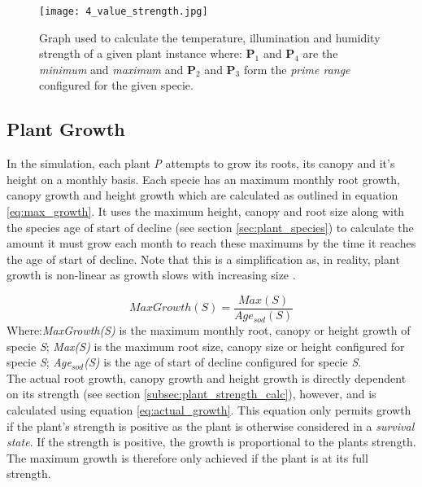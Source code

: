 \begin{figure}
\center
	\texttt{[image: 4\_value\_strength.jpg]}
	\caption{ Graph used to calculate the temperature, illumination and humidity strength of a given plant instance where: \textbf{P$_{1}$} and \textbf{P$_{4}$} are the \textit{minimum} and \textit{maximum} and \textbf{P$_{2}$} and \textbf{P$_{3}$} form the \textit{prime range} configured for the given specie.  }	
	\label{fig:4_value_strength}
\end{figure}

\subsection{Plant Growth}

In the simulation, each plant \textit{P} attempts to grow its roots, its canopy and it's height on a monthly basis. Each specie has an maximum monthly root growth, canopy growth and height growth which are calculated as outlined in equation \ref{eq:max_growth}. It uses the maximum height, canopy and root size along with the species age of start of decline (see section \ref{sec:plant_species}) to calculate the amount it must grow each month to reach these maximums by the time it reaches the age of start of decline. Note that this is a simplification as, in reality, plant growth is non-linear as growth slows with increasing size \cite{Paine2012}.

\begin{equation}
MaxGrowth(S) = \frac{Max(S)}{Age_{sod}(S)}
\label{eq:max_growth}
\end{equation}
Where:\textit{MaxGrowth(S)} is the maximum monthly root, canopy or height growth of specie \textit{S}; \textit{Max(S)} is the maximum root size, canopy size or height configured for specie \textit{S}; \textit{Age$_{sod}$(S)} is the age of start of decline configured for specie \textit{S}.\\

The actual root growth, canopy growth and height growth is directly dependent on its strength (see section \ref{subsec:plant_strength_calc}), however, and is calculated using equation \ref{eq:actual_growth}. This equation only permits growth if the plant's strength is positive as the plant is otherwise considered in a \textit{survival state}. If the strength is positive, the growth is proportional to the plants strength. The maximum growth is therefore only achieved if the plant is at its full strength.\\

